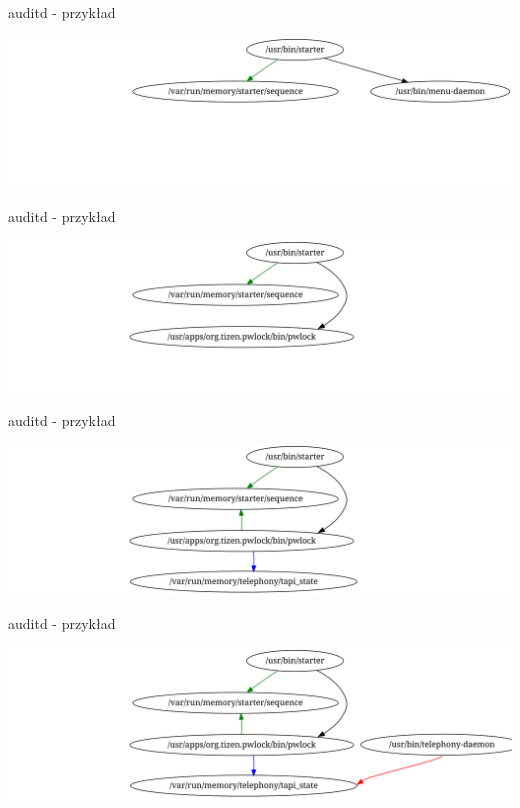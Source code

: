 \documentclass[presentation,aspectratio=43,12pt]{beamer}
\begin{document}
\begin{frame}[label=sec-6-8]{auditd - przykład}
\begin{center}
\includegraphics[width=\textwidth]{images/auditd-2}
\end{center}
\end{frame}
\begin{frame}[label=sec-6-9]{auditd - przykład}
\begin{center}
\includegraphics[width=\textwidth]{images/auditd-3}
\end{center}
\end{frame}

\begin{frame}[label=sec-6-10]{auditd - przykład}
\begin{center}
\includegraphics[width=\textwidth]{images/auditd-4}
\end{center}
\end{frame}

\begin{frame}[label=sec-6-11]{auditd - przykład}
\begin{center}
\includegraphics[width=\textwidth]{images/auditd-5}
\end{center}
\end{frame}
\end{document}
